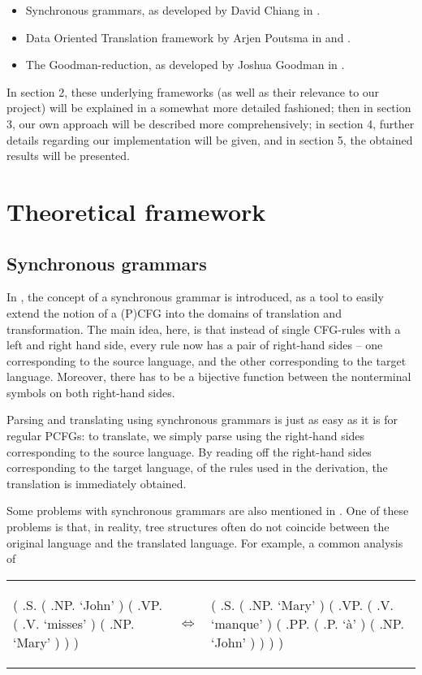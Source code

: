 \documentclass[a4paper]{article}
\theoremstyle{definition}
\begin{document}
{{\begin{itemize}
\item Synchronous grammars, as developed by David Chiang in \cite{Ch}.
\item Data Oriented Translation framework by Arjen Poutsma in \cite{Po} and
	\cite{Po2}.
\item The Goodman-reduction, as developed by Joshua Goodman in \cite{Go}.
\end{itemize}

In section 2, these underlying frameworks (as well as their relevance to our
project) will be explained in a somewhat more detailed fashioned; then in
section 3, our own approach will be described more comprehensively; in section
4, further details regarding our implementation will be given, and in section
5, the obtained results will be presented.

\section{Theoretical framework}

\subsection{Synchronous grammars}

In \cite{Ch}, the concept of a synchronous grammar is introduced, as a tool to
easily extend the notion of a (P)CFG into the domains of translation and
transformation. The main idea, here, is that instead of single CFG-rules with a
left and right hand side, every rule now has a pair of right-hand sides -- one
corresponding to the source language, and the other corresponding to the target
language. Moreover, there has to be a bijective function between the
nonterminal symbols on both right-hand sides.

Parsing and translating using synchronous grammars is just as easy as it is for
regular PCFGs: to translate, we simply parse using the right-hand sides
corresponding to the source language. By reading off the right-hand sides
corresponding to the target language, of the rules used in the derivation, the
translation is immediately obtained.

Some problems with synchronous grammars are also mentioned in \cite{Ch}. One of
these problems is that, in reality, tree structures often do not coincide
between the original language and the translated language. For example, a
common analysis of 

\begin{tabular}{lll}
\begin{parsetree}
( .S.
	( .NP. `John' )
	( .VP.
		( .V. `misses' )
		( .NP. `Mary' )
	)
)
\end{parsetree}
& $\iff$ &
\begin{parsetree}
( .S.
	( .NP. `Mary' )
	( .VP.
		( .V. `manque' )
		( .PP.
			( .P. `à' )
			( .NP. `John' )
		)
	)
)
\end{parsetree}
\end{tabular}

}}
\end{document}
